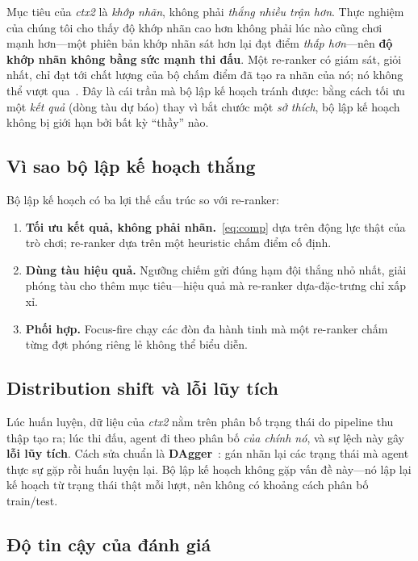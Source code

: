 \documentclass[conference]{IEEEtran}
\begin{document}
Mục tiêu của \textit{ctx2} là \emph{khớp nhãn}, không phải \emph{thắng nhiều trận hơn}. Thực nghiệm của chúng tôi cho thấy độ khớp nhãn cao hơn không phải lúc nào cũng chơi mạnh hơn---một phiên bản khớp nhãn sát hơn lại đạt điểm \emph{thấp hơn}---nên \textbf{độ khớp nhãn không bằng sức mạnh thi đấu}. Một re-ranker có giám sát, giỏi nhất, chỉ đạt tới chất lượng của bộ chấm điểm đã tạo ra nhãn của nó; nó không thể vượt qua~\cite{imitation_survey2017}. Đây là cái trần mà bộ lập kế hoạch tránh được: bằng cách tối ưu một \emph{kết quả} (dòng tàu dự báo) thay vì bắt chước một \emph{sở thích}, bộ lập kế hoạch không bị giới hạn bởi bất kỳ ``thầy'' nào.

\subsection{Vì sao bộ lập kế hoạch thắng}

Bộ lập kế hoạch có ba lợi thế cấu trúc so với re-ranker:
\begin{enumerate}
\item \textbf{Tối ưu kết quả, không phải nhãn.}~\eqref{eq:comp} dựa trên động lực thật của trò chơi; re-ranker dựa trên một heuristic chấm điểm cố định.
\item \textbf{Dùng tàu hiệu quả.} Ngưỡng chiếm gửi đúng hạm đội thắng nhỏ nhất, giải phóng tàu cho thêm mục tiêu---hiệu quả mà re-ranker dựa-đặc-trưng chỉ xấp xỉ.
\item \textbf{Phối hợp.} Focus-fire chạy các đòn đa hành tinh mà một re-ranker chấm từng đợt phóng riêng lẻ không thể biểu diễn.
\end{enumerate}

\subsection{Distribution shift và lỗi lũy tích}

Lúc huấn luyện, dữ liệu của \textit{ctx2} nằm trên phân bố trạng thái do pipeline thu thập tạo ra; lúc thi đấu, agent đi theo phân bố \emph{của chính nó}, và sự lệch này gây \textbf{lỗi lũy tích}. Cách sửa chuẩn là \textbf{DAgger}~\cite{dagger2011}: gán nhãn lại các trạng thái mà agent thực sự gặp rồi huấn luyện lại. Bộ lập kế hoạch không gặp vấn đề này---nó lập lại kế hoạch từ trạng thái thật mỗi lượt, nên không có khoảng cách phân bố train/test.

\subsection{Độ tin cậy của đánh giá}
\end{document}
